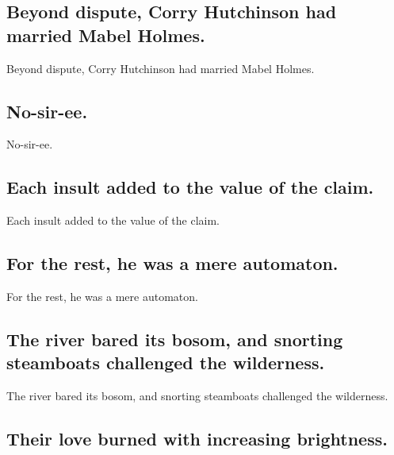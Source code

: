 \documentclass[]{article}
\begin{document}
\hypertarget{beyond-dispute-corry-hutchinson-had-married-mabel-holmes.}{%
\subsection{Beyond dispute, Corry Hutchinson had married Mabel
Holmes.}\label{beyond-dispute-corry-hutchinson-had-married-mabel-holmes.}}

Beyond dispute, Corry Hutchinson had married Mabel Holmes.

\hypertarget{no-sir-ee.}{%
\subsection{No-sir-ee.}\label{no-sir-ee.}}

No-sir-ee.

\hypertarget{each-insult-added-to-the-value-of-the-claim.}{%
\subsection{Each insult added to the value of the
claim.}\label{each-insult-added-to-the-value-of-the-claim.}}

Each insult added to the value of the claim.

\hypertarget{for-the-rest-he-was-a-mere-automaton.}{%
\subsection{For the rest, he was a mere
automaton.}\label{for-the-rest-he-was-a-mere-automaton.}}

For the rest, he was a mere automaton.

\hypertarget{the-river-bared-its-bosom-and-snorting-steamboats-challenged-the-wilderness.}{%
\subsection{The river bared its bosom, and snorting steamboats
challenged the
wilderness.}\label{the-river-bared-its-bosom-and-snorting-steamboats-challenged-the-wilderness.}}

The river bared its bosom, and snorting steamboats challenged the
wilderness.

\hypertarget{their-love-burned-with-increasing-brightness.}{%
\subsection{Their love burned with increasing
brightness.}\label{their-love-burned-with-increasing-brightness.}}
\end{document}
